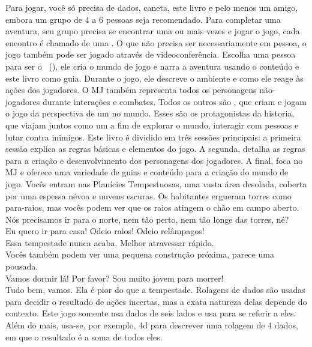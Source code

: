 Para jogar, você só precisa de dados, caneta, este livro e pelo menos um amigo, embora um grupo de 4 a 6 pessoas seja recomendado. Para completar uma aventura, seu grupo precisa se encontrar uma ou mais vezes e jogar o jogo, cada encontro é chamado de uma .
O que não precisa ser necessariamente em pessoa, o jogo também pode ser jogado através de videoconferência.
%
\ofpar
%
Escolha uma pessoa para ser o ~(), ele cria o mundo de jogo e narra a aventura usando o conteúdo e este livro como guia. 
Durante o jogo, ele descreve o ambiente e como ele reage às ações dos jogadores.
O MJ também representa todos os personagens não-jogadores durante interações e combates.
Todos os outros são , que criam e jogam o jogo da perspectiva de um  no mundo. 
Esses são os protagonistas da historia, que viajam juntos como um   a fim de explorar o mundo, interagir com pessoas e lutar contra inimigos. 
Este livro é dividido em três sessões principais: a primeira sessão explica as regras básicas e elementos do jogo. 
A segunda, detalha as regras para a criação e desenvolvimento dos personagens dos jogadores. 
A final, foca no MJ e oferece uma variedade de guias e conteúdo para a criação do mundo de jogo.
%
\vfill
%
{
	\newcommand{\nl}{\vspace{0.2cm}\\}
	 Vocês entram nas Planícies Tempestuosas, uma vasta área desolada, coberta por uma espessa névoa e nuvens escuras. Os habitantes ergueram torres como para-raios, mas vocês podem ver que os raios atingem o chão em campo aberto.\nl
	 Nós precisamos ir para o norte, nem tão perto, nem tão longe das torres, né?\nl
	 Eu quero ir para casa! Odeio raios! Odeio relâmpagos!\nl
	 Essa tempestade nunca acaba. Melhor atravessar rápido.\nl
	 Vocês também podem ver uma pequena construção próxima, parece uma pousada.\nl
	 Vamos dormir lá! Por favor? Sou muito jovem para morrer!\nl
	 Tudo bem, vamos. Ela é pior do que a tempestade.
}
%
\vfill
%
	Rolagens de dados são usadas para decidir o resultado de ações incertas, mas a exata natureza delas depende do contexto. 
	Este jogo somente usa dados de seis lados e usa  para se referir a eles. 
	Além do mais, usa-se, por exemplo, 4d para descrever uma rolagem de 4 dados, em que o resultado é a soma de todos eles.
